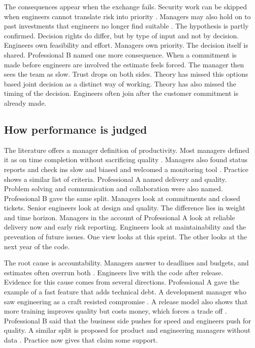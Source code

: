 \documentclass[conference]{IEEEtran}
\begin{document}
The consequences appear when the exchange fails. Security work can be skipped when engineers cannot translate risk into priority \cite{weir2023}. Managers may also hold on to past investments that engineers no longer find suitable \cite{pisirir2023}. The hypothesis is partly confirmed. Decision rights do differ, but by type of input and not by decision. Engineers own feasibility and effort. Managers own priority. The decision itself is shared. Professional B named one more consequence. When a commitment is made before engineers are involved the estimate feels forced. The manager then sees the team as slow. Trust drops on both sides. Theory has missed this options based joint decision as a distinct way of working. Theory has also missed the timing of the decision. Engineers often join after the customer commitment is already made.

\subsection{How performance is judged}

The literature offers a manager definition of productivity. Most managers defined it as on time completion without sacrificing quality \cite{suwarno2025}. Managers also found status reports and check ins slow and biased and welcomed a monitoring tool \cite{suwarno2025}. Practice shows a similar list of criteria. Professional A named delivery and quality. Problem solving and communication and collaboration were also named. Professional B gave the same split. Managers look at commitments and closed tickets. Senior engineers look at design and quality. The difference lies in weight and time horizon. Managers in the account of Professional A look at reliable delivery now and early risk reporting. Engineers look at maintainability and the prevention of future issues. One view looks at this sprint. The other looks at the next year of the code.

The root cause is accountability. Managers answer to deadlines and budgets, and estimates often overrun both \cite{tarawneh2018}. Engineers live with the code after release. Evidence for this cause comes from several directions. Professional A gave the example of a fast feature that adds technical debt. A development manager who saw engineering as a craft resisted compromise \cite{graetsch2023}. A release model also shows that more training improves quality but costs money, which forces a trade off \cite{yeh2024}. Professional B said that the business side pushes for speed and engineers push for quality. A similar split is proposed for product and engineering managers without data \cite{babu2025}. Practice now gives that claim some support.
\end{document}
